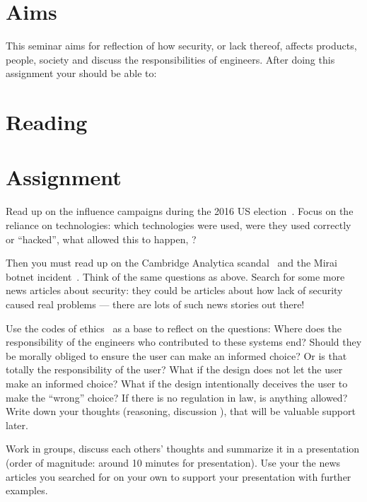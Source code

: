 \section{Aims}

This seminar aims for reflection of how security, or lack thereof, affects 
products, people, society and discuss the responsibilities of engineers.
After doing this assignment your should be able to:
\begin{itemize}
	
\end{itemize}


\section{Reading}%
\label{sec:Reading}




\section{Assignment}%
\label{sec:Tasks}

Read up on the influence campaigns during the 2016 US 
election~\cite{inside-russian-influence-campaign}.
Focus on the reliance on technologies: which technologies were used, were they 
used correctly or \enquote{hacked}, what allowed this to happen, \etc?

Then you must read up on the Cambridge Analytica scandal~\cite[\eg][]{%
  wired-cambridge-analytica,
  guardian-cambridge-analytica,
  nytimes-cambridge-analytica,
  wp-cambridge-analytica,
} and the Mirai botnet incident~\cite{schneier-mirai}.
Think of the same questions as above.
Search for some more news articles about security: they could be articles about 
how lack of security caused real problems --- there are lots of such news 
stories out there!

Use the codes of ethics~\cite{acmcode,acmsecode,ieeecode} as a base to reflect 
on the questions: Where does the responsibility of the engineers who 
contributed to these systems end?
Should they be morally obliged to ensure the user can make an informed choice?
Or is that totally the responsibility of the user?
What if the design does not let the user make an informed choice?
What if the design intentionally deceives the user to make the \enquote{wrong} 
choice?
If there is no regulation in law, is anything allowed?
Write down your thoughts (reasoning, discussion \etc), that will be valuable 
support later.

Work in groups, discuss each others' thoughts and summarize it in a 
presentation (order of magnitude: around 10 minutes for presentation).
Use your the news articles you searched for on your own to support your 
presentation with further examples.


